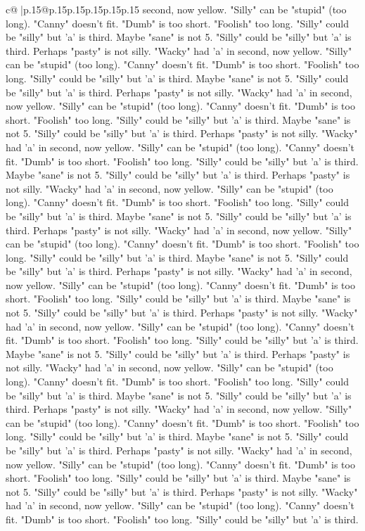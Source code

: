 \documentclass{article}
\begin{document}
{\begin{supertabular}{c@{$\;$}|p{.15\linewidth}@{}p{.15\linewidth}p{.15\linewidth}p{.15\linewidth}p{.15\linewidth}p{.15\linewidth}}
{{{second, now yellow. "Silly" can be "stupid" (too long). "Canny" doesn't fit. "Dumb" is too short. "Foolish" too long. "Silly" could be "silly" but 'a' is third. Maybe "sane" is not 5. "Silly" could be "silly" but 'a' is third. Perhaps "pasty" is not silly. "Wacky" had 'a' in second, now yellow. "Silly" can be "stupid" (too long). "Canny" doesn't fit. "Dumb" is too short. "Foolish" too long. "Silly" could be "silly" but 'a' is third. Maybe "sane" is not 5. "Silly" could be "silly" but 'a' is third. Perhaps "pasty" is not silly. "Wacky" had 'a' in second, now yellow. "Silly" can be "stupid" (too long). "Canny" doesn't fit. "Dumb" is too short. "Foolish" too long. "Silly" could be "silly" but 'a' is third. Maybe "sane" is not 5. "Silly" could be "silly" but 'a' is third. Perhaps "pasty" is not silly. "Wacky" had 'a' in second, now yellow. "Silly" can be "stupid" (too long). "Canny" doesn't fit. "Dumb" is too short. "Foolish" too long. "Silly" could be "silly" but 'a' is third. Maybe "sane" is not 5. "Silly" could be "silly" but 'a' is third. Perhaps "pasty" is not silly. "Wacky" had 'a' in second, now yellow. "Silly" can be "stupid" (too long). "Canny" doesn't fit. "Dumb" is too short. "Foolish" too long. "Silly" could be "silly" but 'a' is third. Maybe "sane" is not 5. "Silly" could be "silly" but 'a' is third. Perhaps "pasty" is not silly. "Wacky" had 'a' in second, now yellow. "Silly" can be "stupid" (too long). "Canny" doesn't fit. "Dumb" is too short. "Foolish" too long. "Silly" could be "silly" but 'a' is third. Maybe "sane" is not 5. "Silly" could be "silly" but 'a' is third. Perhaps "pasty" is not silly. "Wacky" had 'a' in second, now yellow. "Silly" can be "stupid" (too long). "Canny" doesn't fit. "Dumb" is too short. "Foolish" too long. "Silly" could be "silly" but 'a' is third. Maybe "sane" is not 5. "Silly" could be "silly" but 'a' is third. Perhaps "pasty" is not silly. "Wacky" had 'a' in second, now yellow. "Silly" can be "stupid" (too long). "Canny" doesn't fit. "Dumb" is too short. "Foolish" too long. "Silly" could be "silly" but 'a' is third. Maybe "sane" is not 5. "Silly" could be "silly" but 'a' is third. Perhaps "pasty" is not silly. "Wacky" had 'a' in second, now yellow. "Silly" can be "stupid" (too long). "Canny" doesn't fit. "Dumb" is too short. "Foolish" too long. "Silly" could be "silly" but 'a' is third. Maybe "sane" is not 5. "Silly" could be "silly" but 'a' is third. Perhaps "pasty" is not silly. "Wacky" had 'a' in second, now yellow. "Silly" can be "stupid" (too long). "Canny" doesn't fit. "Dumb" is too short. "Foolish" too long. "Silly" could be "silly" but 'a' is third. Maybe "sane" is not 5. "Silly" could be "silly" but 'a' is third. Perhaps "pasty" is not silly. "Wacky" had 'a' in second, now yellow. "Silly" can be "stupid" (too long). "Canny" doesn't fit. "Dumb" is too short. "Foolish" too long. "Silly" could be "silly" but 'a' is third. Maybe "sane" is not 5. "Silly" could be "silly" but 'a' is third. Perhaps "pasty" is not silly. "Wacky" had 'a' in second, now yellow. "Silly" can be "stupid" (too long). "Canny" doesn't fit. "Dumb" is too short. "Foolish" too long. "Silly" could be "silly" but 'a' is third. }}}
\end{supertabular}}
\end{document}
